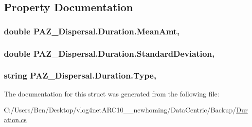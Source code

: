 \subsection{Property Documentation}
\hypertarget{struct_p_a_z___dispersal_1_1_duration_a5a1aa7ab567fb35590f43e1897780f44}{
\subsubsection[{Mean\-Amt}]{\setlength{\rightskip}{0pt plus 5cm}double P\-A\-Z\-\_\-\-Dispersal.\-Duration.\-Mean\-Amt\hspace{0.3cm}{\ttfamily [get]}, {\ttfamily [set]}}}\label{struct_p_a_z___dispersal_1_1_duration_a5a1aa7ab567fb35590f43e1897780f44}
\hypertarget{struct_p_a_z___dispersal_1_1_duration_ab15378e0a7c48e692b02f20c6b578c5f}{
\subsubsection[{Standard\-Deviation}]{\setlength{\rightskip}{0pt plus 5cm}double P\-A\-Z\-\_\-\-Dispersal.\-Duration.\-Standard\-Deviation\hspace{0.3cm}{\ttfamily [get]}, {\ttfamily [set]}}}\label{struct_p_a_z___dispersal_1_1_duration_ab15378e0a7c48e692b02f20c6b578c5f}
\hypertarget{struct_p_a_z___dispersal_1_1_duration_af87a4a27fedd3b6a0921858186a6ca04}{
\subsubsection[{Type}]{\setlength{\rightskip}{0pt plus 5cm}string P\-A\-Z\-\_\-\-Dispersal.\-Duration.\-Type\hspace{0.3cm}{\ttfamily [get]}, {\ttfamily [set]}}}\label{struct_p_a_z___dispersal_1_1_duration_af87a4a27fedd3b6a0921858186a6ca04}


The documentation for this struct was generated from the following file\-:\begin{DoxyCompactItemize}
\item 
C\-:/\-Users/\-Ben/\-Desktop/vlog4net\-A\-R\-C10\-\_\-\_\-newhoming/\-Data\-Centric/\-Backup/\hyperlink{_backup_2_duration_8cs}{Duration.\-cs}\end{DoxyCompactItemize}
